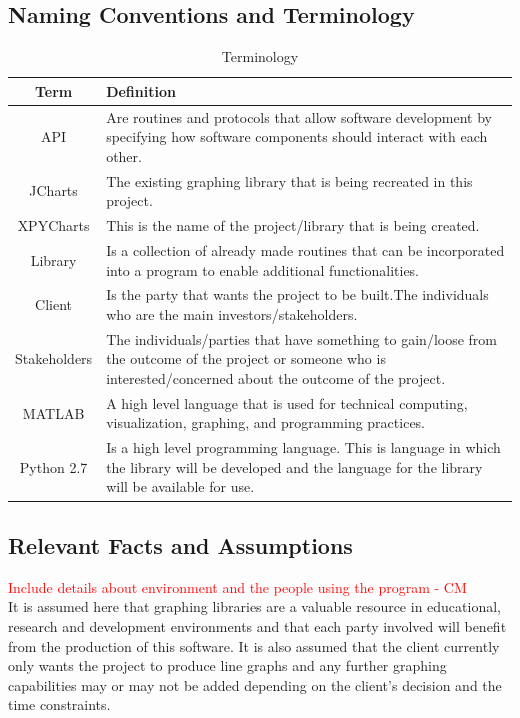 \documentclass[12pt, titlepage]{article}
\begin{document}
\subsection{Naming Conventions and Terminology}
\begin{center}
\begin{table}[!hpb]
    \caption{Terminology} 
    \begin{tabular}{ |c|p{11cm}|}
	\hline
	Term & Definition\\ \hline
	API & Are routines and protocols that allow software development by specifying how software components should interact with each other.  \\ \hline
	JCharts & The existing graphing library that is being recreated in this project.\\ \hline
	XPYCharts & This is the name of the project/library that is being created.\\ \hline
	Library & Is a collection of already made routines that can be incorporated into a program to enable additional functionalities.\\ \hline
	Client & Is the party that wants the project to be built.The individuals who are the main investors/stakeholders.\\ \hline
	Stakeholders & The individuals/parties that have something to gain/loose from the outcome of the project or someone who is interested/concerned about the outcome of the project.\\ \hline
	MATLAB & A high level language that is used for technical computing, visualization, graphing, and programming practices.\\ \hline
	Python 2.7 & Is a high level programming language. This is language in which the library will be developed and the language for the library will be available for use.\\ \hline
    \end{tabular}
\end{table}
\end{center}
\subsection{Relevant Facts and Assumptions}
\textcolor{red}{Include details about environment and the people using the program - CM} \\
It is assumed here that graphing libraries are a valuable resource in educational, research and development environments and that each party involved will benefit from the production of this software. It is also assumed that the client currently only wants the project to produce line graphs and any further graphing capabilities may or may not be added depending on the client's decision and the time constraints.
\clearpage
\end{document}
